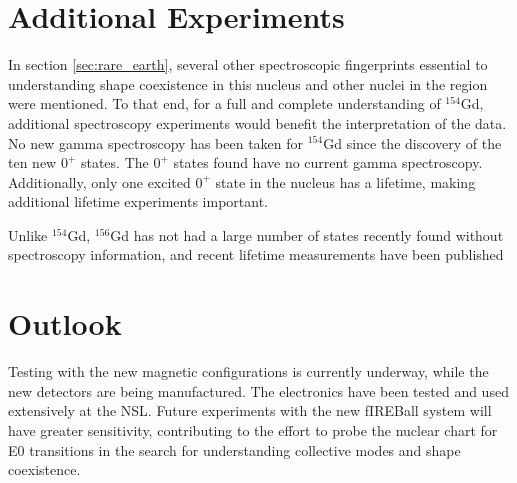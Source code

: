 \section{Additional Experiments}

In section \ref{sec:rare_earth}, several other spectroscopic fingerprints essential to understanding shape coexistence in this nucleus and other nuclei in the region were mentioned. To that end, for a full and complete understanding of $^{154}$Gd, additional spectroscopy experiments would benefit the interpretation of the data. No new gamma spectroscopy has been taken for $^{154}$Gd since the discovery of the ten new $0^+$ states\citep{meyer06:_zeroplus}. The $0^+$ states found have no current gamma spectroscopy. Additionally, only one excited $0^+$ state in the nucleus has a lifetime, making additional lifetime experiments important.

Unlike $^{154}$Gd, $^{156}$Gd has not had a large number of states recently found without spectroscopy information, and recent lifetime measurements have been published \citep{aprahamian18:_156gd}

\section{Outlook}

Testing with the new magnetic configurations is currently underway, while the new detectors are being manufactured. The electronics have been tested and used extensively at the NSL. Future experiments with the new fIREBall system will have greater sensitivity, contributing to the effort to probe the nuclear chart for E0 transitions in the search for understanding collective modes and shape coexistence.


